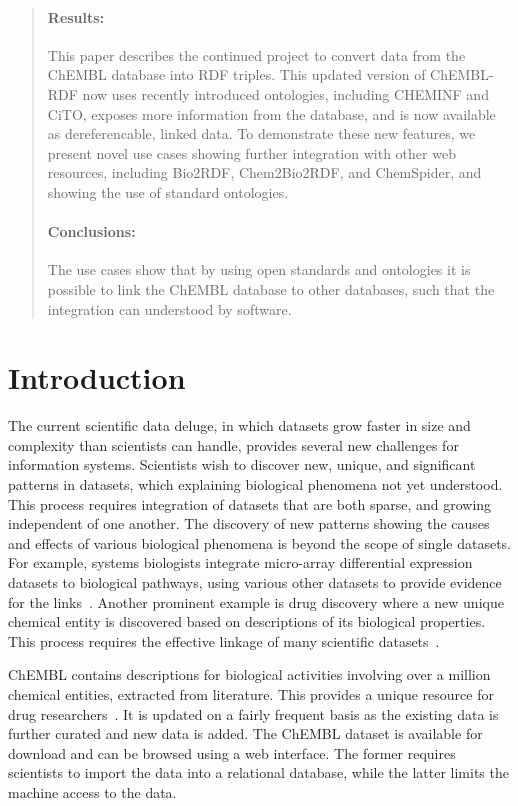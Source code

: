\documentclass[10pt]{bmc_article}
\newenvironment{bmcformat}{\begin{raggedright}\baselineskip20pt\sloppy\setboolean{publ}{false}}{\end{raggedright}\baselineskip20pt\sloppy}
\begin{document}
\begin{bmcformat}
\begin{abstract}
\paragraph*{Results:}
This paper describes the continued project to convert data from the ChEMBL database into RDF triples.
This updated version of ChEMBL-RDF now uses recently introduced ontologies, including CHEMINF and CiTO,
exposes more information from the database, and is now available as dereferencable, linked data.
To demonstrate these new features, we present novel use cases showing further integration with
other web resources, including Bio2RDF, Chem2Bio2RDF, and ChemSpider, and showing the use of standard
ontologies.
\paragraph*{Conclusions:}
The use cases show that by using open standards and ontologies it is possible to link the ChEMBL database
to other databases, such that the integration can understood by software. 
\end{abstract}



\section*{Introduction}
\label{s1}


The current scientific data deluge, in which datasets grow faster in size and complexity than scientists can handle,
provides several new challenges for information systems. Scientists wish to 
discover new, unique, and significant patterns in datasets, which explaining biological 
phenomena not yet understood. This process requires integration of datasets that are both 
sparse, and growing independent of one another. The discovery of new patterns showing the 
causes and effects of various biological phenomena is beyond the scope of single datasets.
For example, systems biologists integrate micro-array differential expression datasets to 
biological pathways, using various other datasets to provide evidence for the links~\cite{Staab2007}. 
Another prominent example is drug discovery where a new unique chemical entity is discovered 
based on descriptions of its biological properties. This process requires the effective 
linkage of many scientific datasets~\cite{Samwald2011,OpenPHACTS}.

ChEMBL contains descriptions for biological activities involving over a million chemical 
entities, extracted from literature. This provides a unique resource for drug researchers~\cite{Gaulton2012,Warr2009}.
It is updated on a fairly frequent basis as the existing data is further curated and new data is added. 
The ChEMBL dataset is available for download and can be browsed using a web interface. 
The former requires scientists to import the data into a relational database, while the 
latter limits the machine access to the data.


\end{bmcformat}
\end{document}
